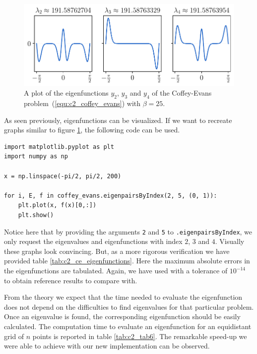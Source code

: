 \begin{figure}
    \begin{center}
        \includegraphics[width=1\textwidth]{img/chapter2/pyslise_test/coffey_evans_eigenfunctions.pdf}
    \end{center}
    \caption{A plot of the eigenfunctions $y_2$, $y_3$ and $y_4$ of the Coffey-Evans problem~(\ref{equ:c2_coffey_evans}) with $\beta=25$.}\label{fig:coffey_evans_eigenfunctions}
\end{figure}

As seen previously, eigenfunctions can be visualized. If we want to recreate graphs similar to figure \ref{fig:coffey_evans_eigenfunctions}, the following code can be used.
\begin{verbatim}
import matplotlib.pyplot as plt
import numpy as np

x = np.linspace(-pi/2, pi/2, 200)

for i, E, f in coffey_evans.eigenpairsByIndex(2, 5, (0, 1)):
    plt.plot(x, f(x)[0,:])
    plt.show()
\end{verbatim}
Notice here that by providing the arguments \texttt{2} and \texttt{5} to \texttt{.eigenpairsByIndex}, we only request the eigenvalues and eigenfunctions with index $2$, $3$ and $4$. Visually these graphs look convincing. But, as a more rigorous verification we have provided table \ref{tab:c2_ce_eigenfunctions}. Here the maximum absolute errors in the eigenfunctions are tabulated. Again, we have used  with a tolerance of $10^{-14}$ to obtain reference results to compare with.


From the theory we expect that the time needed to evaluate the eigenfunction does not depend on the difficulties to find eigenvalues for that particular problem. Once an eigenvalue is found, the corresponding eigenfunction should be easily calculated. The computation time to evaluate an eigenfunction for an equidistant grid of $n$ points is reported in table \ref{tab:c2_tab6}. The remarkable speed-up we were able to achieve with our new implementation can be observed.

